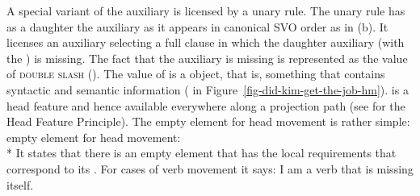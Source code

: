 \documentclass[output=paper]{langsci/langscibook}
\begin{document}
A special variant of the auxiliary is licensed by a unary rule. The unary rule has as a daughter the auxiliary as
it appears in canonical SVO order as in (b). It licenses an auxiliary selecting a full clause
in which the daughter auxiliary (with the \locv {}) is missing. The fact
that the auxiliary is missing is represented as the value of \textsc{double slash} (\dsl). The value of \dsl is a
 object, that is, something that contains syntactic and semantic information (
in Figure~\ref{fig-did-kim-get-the-job-hm}). \dsl is a head feature and hence available everywhere
along a projection path (see  for the Head Feature
Principle). The empty element for
head movement is rather simple:
\ea
empty element for head movement:\\*
\z
It states that there is an empty element that has the local requirements that correspond to its
\dslv. For cases of verb movement it says: I am a verb that is missing itself. 
\end{document}
